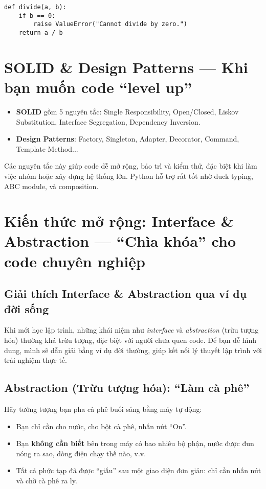 \begin{lstlisting}[caption={Ví dụ kiểm tra đầu vào}]
def divide(a, b):
    if b == 0:
        raise ValueError("Cannot divide by zero.")
    return a / b
\end{lstlisting}

\section{SOLID \& Design Patterns --- Khi bạn muốn code ``level up''}
\begin{itemize}
    \item \textbf{SOLID} gồm 5 nguyên tắc: Single Responsibility, Open/Closed, Liskov Substitution, Interface Segregation, Dependency Inversion.
    \item \textbf{Design Patterns}: Factory, Singleton, Adapter, Decorator, Command, Template Method...
\end{itemize}

Các nguyên tắc này giúp code dễ mở rộng, bảo trì và kiểm thử, đặc biệt khi làm việc nhóm hoặc xây dựng hệ thống lớn. Python hỗ trợ rất tốt nhờ duck typing, ABC module, và composition.

\section{Kiến thức mở rộng: Interface \& Abstraction --- ``Chìa khóa'' cho code chuyên nghiệp}

\subsection{Giải thích Interface \& Abstraction qua ví dụ đời sống}
Khi mới học lập trình, những khái niệm như \emph{interface} và \emph{abstraction} (trừu tượng hóa) thường khá trừu tượng, đặc biệt với người chưa quen code. Để bạn dễ hình dung, mình sẽ dẫn giải bằng ví dụ đời thường, giúp kết nối lý thuyết lập trình với trải nghiệm thực tế.

\subsection{Abstraction (Trừu tượng hóa): ``Làm cà phê''}
Hãy tưởng tượng bạn pha cà phê buổi sáng bằng máy tự động:

\begin{itemize}
    \item Bạn chỉ cần cho nước, cho bột cà phê, nhấn nút ``On''.
    \item Bạn \textbf{không cần biết} bên trong máy có bao nhiêu bộ phận, nước được đun nóng ra sao, dòng điện chạy thế nào, v.v.
    \item Tất cả phức tạp đã được ``giấu'' sau một giao diện đơn giản: chỉ cần nhấn nút và chờ cà phê ra ly.
\end{itemize}


